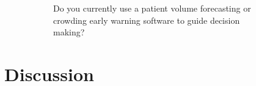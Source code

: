 \documentclass{article}
\begin{document}
\begin{figure}[H]
\begin{subfigure}[b]{0.45\textwidth}
        \caption{Do you currently use a patient volume forecasting or crowding early warning software to guide decision making?}
        \label{fig:software_usage}
    \end{subfigure}
    \caption{}
    \label{fig:software_usage}
\end{figure}

\section{Discussion}
\lipsum[5]
\end{document}
